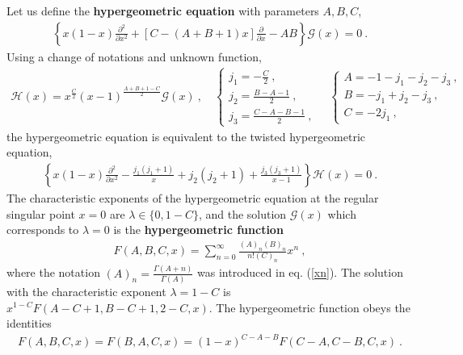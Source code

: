 \documentclass[12pt,a4paper,notitlepage]{report}
\newcommand \bla {\left\{\begin{array}{l} }
\newcommand \ela {\end{array}\right. }
\newcommand \p {\partial}
\newcommand \pp[1] {{\frac{\p}{\p #1}}}
\numberwithin{equation}{section}
\theoremstyle{break}
\begin{document}
 Let us define the \textbf{\boldmath hypergeometric equation} with parameters $A,B,C$, 
\begin{align}
 \left\{ x(1-x) \frac{\p^2}{\p x^2} +\left[C-(A+B+1)x\right]\pp{x} - AB \right\} \mathcal{G}(x)= 0\ .
\label{dzp}
\end{align}
Using a change of notations and unknown function,
\begin{align}
 \mathcal{H}(x)= x^{\frac{C}{2}} (x-1)^{\frac{A+B+1-C}{2}}\mathcal{G}(x)\ , \quad \bla j_1 = -\frac{C}{2} \ , \\ j_2=\frac{B-A-1}{2} \ , \\  j_3= \frac{C-A-B-1}{2}\ , \ela   
\quad \bla A = -1-j_1-j_2-j_3\ , \\ B = -j_1+j_2-j_3\ , \\ C = -2j_1\ , \ela
\end{align}
the hypergeometric equation is equivalent to the twisted hypergeometric equation,
\begin{align}
 \left\{ x(1-x) \frac{\p^2}{\p x^2}  -\frac{j_1(j_1+1)}{x}+ j_2(j_2+1)+\frac{j_3(j_3+1)}{x-1}\right\} \mathcal{H}(x) = 0\ .
\label{hj}
\end{align}
The characteristic exponents of the hypergeometric equation at the regular singular point $x=0$ are $\lambda\in \{0,1-C\}$, and the solution $\mathcal{G}(x)$ which corresponds to $\lambda=0$
 is the \textbf{\boldmath hypergeometric function}
\begin{align}
 F(A,B,C,x) = \sum_{n=0}^\infty \frac{(A)_n(B)_n}{n!(C)_n}x^n\ ,
\label{fsn}
\end{align}
where the notation $(A)_n = \frac{\Gamma(A+n)}{\Gamma(A)}$ was introduced in eq. (\ref{xn}). The solution with the characteristic exponent $\lambda=1-C$ is $x^{1-C}F(A-C+1,B-C+1,2-C,x)$. The hypergeometric function obeys the identities 
\begin{align}
 F(A,B,C,x) = F(B,A,C,x) = (1-x)^{C-A-B} F(C-A,C-B,C,x)\ .
\label{fff}
\end{align}
\end{document}
